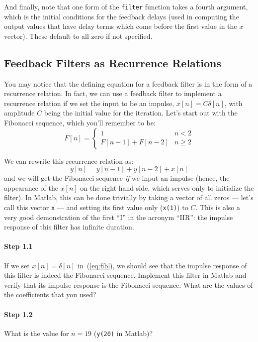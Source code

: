 And finally, note that one form of the \verb|filter| function takes a
fourth argument, which is the initial conditions for the feedback
delays (used in computing the output values that have delay terms
which come before the first value in the $x$ vector). These default to
all zero if not specified. 

\subsection{Feedback Filters as Recurrence Relations}

You may notice that the defining equation for a feedback filter is in
the form of a recurrence relation. In fact, we can use a feedback
filter to implement a recurrence relation if we set the input to be
an impulse, $x[n] = C \delta[n]$, with amplitude $C$ being the initial
value for the iteration. Let's start out with the Fibonacci sequence,
which you'll remember to be:
\begin{equation}
  F[n] = \left\{ \begin{array}{ll}
      1 & n < 2 \\
      F[n-1] + F[n-2] & n \geq 2
    \end{array} \right.
\end{equation}

We can rewrite this recurrence relation as:
\begin{equation}
  y[n] = y[n-1] + y[n-2] + x[n]
  \label{eq:fib}
\end{equation}
and we will get the Fibonacci sequence \emph{if} we input an impulse
(hence, the appearance of the $x[n]$ on the right hand side, which
serves only to initialize the filter). In Matlab, this can be done
trivially by taking a vector of all zeros --- let's call this vector
\verb|x| --- and setting its first value only (\verb|x(1)|) to
$C$. This is also a very good demonstration of the first ``I'' in the
acronym ``IIR'': the impulse response of this filter has infinite
duration.

\paragraph{Step 1.1} If we set $x[n]=\delta[n]$ in~(\ref{eq:fib}), we
should see that the impulse response of this filter is indeed the
Fibonacci sequence. Implement this filter in Matlab and verify that its
impulse response is the Fibonacci sequence. What are the values of the
coefficients that you used?


\paragraph{Step 1.2} What is the value for $n=19$ (\verb|y(20)| in
Matlab)?


